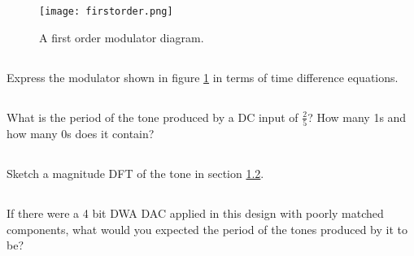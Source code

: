 \section{}

\begin{figure}
    \begin{center}
    \texttt{[image: firstorder.png]}
    \caption{A first order modulator diagram.}
    \label{fig:firstorder}
    \end{center}
\end{figure}

    \subsection{}
    Express the modulator shown in figure \ref{fig:firstorder} in terms of time difference equations.
    
    \subsection{}
    \label{B2:2}
    What is the period of the tone produced by a DC input of $\frac{2}{5}$?
    How many 1s and how many 0s does it contain?

    \subsection{}
    Sketch a magnitude DFT of the tone in section \ref{B2:2}.

    \subsection{}
    If there were a 4 bit DWA DAC applied in this design with poorly matched components, what would you expected the period of the tones produced by it to be?

